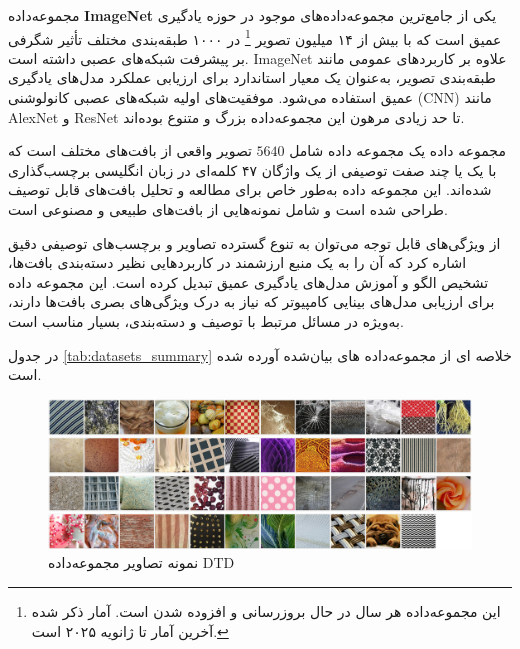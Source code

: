 مجموعه‌داده \textbf{ImageNet} یکی از جامع‌ترین مجموعه‌داده‌های موجود در حوزه یادگیری عمیق است که با بیش از ۱۴ میلیون تصویر
\footnote{این مجموعه‌داده هر سال در حال بروزرسانی و افزوده شدن است. آمار ذکر شده آخرین آمار تا ژانویه ۲۰۲۵ است.}
در ۱۰۰۰ طبقه‌بندی مختلف تأثیر شگرفی بر پیشرفت شبکه‌های عصبی داشته است. ImageNet علاوه بر کاربردهای عمومی مانند طبقه‌بندی تصویر، به‌عنوان یک معیار استاندارد برای ارزیابی عملکرد مدل‌های یادگیری عمیق استفاده می‌شود. موفقیت‌های اولیه شبکه‌های عصبی کانولوشنی (CNN) مانند AlexNet و ResNet تا حد زیادی مرهون این مجموعه‌داده بزرگ و متنوع بوده‌اند.



مجموعه داده
یک مجموعه داده شامل $5640$ تصویر واقعی از بافت‌های مختلف است که با یک یا چند صفت توصیفی از یک واژگان ۴۷ کلمه‌ای در زبان انگلیسی برچسب‌گذاری شده‌اند. این مجموعه داده به‌طور خاص برای مطالعه و تحلیل بافت‌های قابل توصیف طراحی شده است و شامل نمونه‌هایی از بافت‌های طبیعی و مصنوعی است. 

از ویژگی‌های قابل توجه  می‌توان به تنوع گسترده تصاویر و برچسب‌های توصیفی دقیق اشاره کرد که آن را به یک منبع ارزشمند در کاربردهایی نظیر دسته‌بندی بافت‌ها، تشخیص الگو و آموزش مدل‌های یادگیری عمیق تبدیل کرده است. این مجموعه داده برای ارزیابی مدل‌های بینایی کامپیوتر که نیاز به درک ویژگی‌های بصری بافت‌ها دارند، به‌ویژه در مسائل مرتبط با توصیف و دسته‌بندی، بسیار مناسب است.

در جدول \ref{tab:datasets_summary} خلاصه ای از مجموعه‌داده های بیان‌شده آورده شده است.
\warningToSelfExpandable

\begin{figure}
	\centering
	\includegraphics[width=0.7\linewidth]{dtd1}
	\caption{نمونه تصاویر مجموعه‌داده DTD}
	\label{fig:dtd1}
\end{figure}



